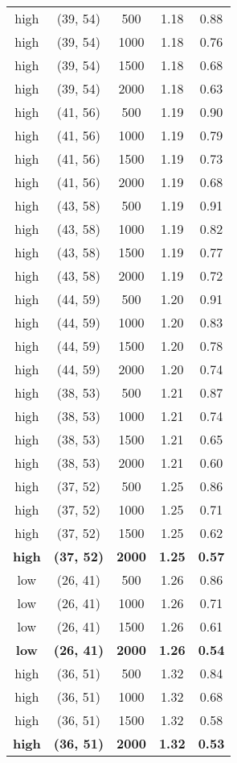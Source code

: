 \begin{tabular}{c c c c c}
high & (39, 54) &  500 & 1.18 & 0.88 \\
high & (39, 54) &  1000 & 1.18 & 0.76 \\
high & (39, 54) &  1500 & 1.18 & 0.68 \\
high & (39, 54) &  2000 & 1.18 & 0.63 \\
high & (41, 56) &  500 & 1.19 & 0.90 \\
high & (41, 56) &  1000 & 1.19 & 0.79 \\
high & (41, 56) &  1500 & 1.19 & 0.73 \\
high & (41, 56) &  2000 & 1.19 & 0.68 \\
high & (43, 58) &  500 & 1.19 & 0.91 \\
high & (43, 58) &  1000 & 1.19 & 0.82 \\
high & (43, 58) &  1500 & 1.19 & 0.77 \\
high & (43, 58) &  2000 & 1.19 & 0.72 \\
high & (44, 59) &  500 & 1.20 & 0.91 \\
high & (44, 59) &  1000 & 1.20 & 0.83 \\
high & (44, 59) &  1500 & 1.20 & 0.78 \\
high & (44, 59) &  2000 & 1.20 & 0.74 \\
high & (38, 53) &  500 & 1.21 & 0.87 \\
high & (38, 53) &  1000 & 1.21 & 0.74 \\
high & (38, 53) &  1500 & 1.21 & 0.65 \\
high & (38, 53) &  2000 & 1.21 & 0.60 \\
high & (37, 52) &  500 & 1.25 & 0.86 \\
high & (37, 52) &  1000 & 1.25 & 0.71 \\
high & (37, 52) &  1500 & 1.25 & 0.62 \\
\textbf{high} & \textbf{(37, 52)} & \textbf{ 2000} & \textbf{1.25} & \textbf{0.57} \\
low & (26, 41) &  500 & 1.26 & 0.86 \\
low & (26, 41) &  1000 & 1.26 & 0.71 \\
low & (26, 41) &  1500 & 1.26 & 0.61 \\
\textbf{low} & \textbf{(26, 41)} & \textbf{ 2000} & \textbf{1.26} & \textbf{0.54} \\
high & (36, 51) &  500 & 1.32 & 0.84 \\
high & (36, 51) &  1000 & 1.32 & 0.68 \\
high & (36, 51) &  1500 & 1.32 & 0.58 \\
\textbf{high} & \textbf{(36, 51)} & \textbf{ 2000} & \textbf{1.32} & \textbf{0.53} \\

\end{tabular}
